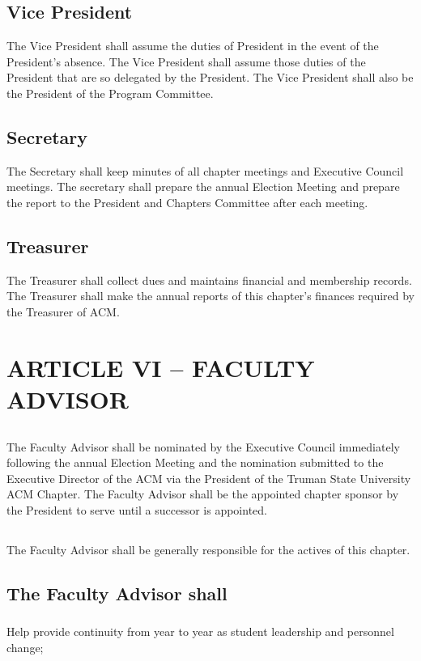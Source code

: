 \documentclass[12pt]{article}
\begin{document}
\subsection{Vice President}	The Vice President shall assume the duties of President in the event of the President's absence. The Vice President shall assume those duties of the President that are so delegated by the President. The Vice President shall also be the President of the Program Committee.
\subsection{Secretary}	The Secretary shall keep minutes of all chapter meetings and Executive Council meetings. The secretary shall prepare the annual Election Meeting and prepare the report to the President and Chapters Committee after each meeting.
\subsection{Treasurer}	The Treasurer shall collect dues and maintains financial and membership records. The Treasurer shall make the annual reports of this chapter's finances required by the Treasurer of ACM.

\section{ARTICLE VI – FACULTY ADVISOR}
\subsection{}	The Faculty Advisor shall be nominated by the Executive Council immediately following the annual Election Meeting and the nomination submitted to the Executive Director of the ACM via the President of the Truman State University ACM Chapter. The Faculty Advisor shall be the appointed chapter sponsor by the President to serve until a successor is appointed.
\subsection{}	The Faculty Advisor shall be generally responsible for the actives of this chapter.
\subsection{The Faculty Advisor shall}
\subsubsection{}	Help provide continuity from year to year as student leadership and personnel change;
\end{document}
